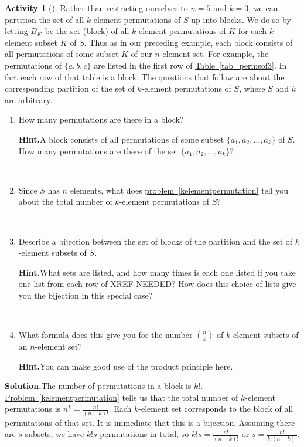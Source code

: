 \documentclass[10pt,]{book}
\theoremstyle{plain}
\theoremstyle{definition}
\newtheorem{activity}[project]{Activity}
\numberwithin{equation}{chapter}
\begin{document}
\begin{activity}[]\label{formulanchoosek}
Rather than restricting ourselves to \(n=5\) and \(k=3\), we can partition the set of all \(k\)-element permutations of \(S\) up into blocks. We do so by letting \(B_K\) be the set (block) of all \(k\)-element permutations of \(K\) for each \(k\)-element subset \(K\) of \(S\). Thus as in our preceding example, each block consists of all permutations of some subset \(K\) of our \(n\)-element set. For example, the permutations of \(\{a,b,c\}\) are listed in the first row of \hyperref[tab_permsof3]{Table~\ref{tab_permsof3}}. In fact each row of that table is a block. The questions that follow are about the corresponding partition of the set of \(k\)-element permutations of \(S\), where \(S\) and \(k\) are arbitrary.%
~\par
\begin{enumerate}[label=(\alph*)]
 \item How many permutations are there in a block?%
\par\medskip\noindent%
\textbf{Hint.}\quad A block consists of all permutations of some subset \(\{a_1 , a_2, \ldots, a_k \}\) of \(S\). How many permutations are there of the set \(\{a_1 , a_2, \ldots, a_k \}\)?%

~\par
\item Since \(S\) has \(n\) elements, what does \hyperref[kelementpermutation]{problem~\ref{kelementpermutation}} tell you about the total number of \(k\)-element permutations of \(S\)?%

~\par
\item Describe a bijection between the set of blocks of the partition and the set of \(k\)-element subsets of \(S\).%
\par\medskip\noindent%
\textbf{Hint.}\quad What sets are listed, and how many times is each one listed if you take one list from each row of XREF NEEDED? How does this choice of lists give you the bijection in this special case?%

~\par
\item What formula does this give you for the number \(\binom{n}{k}\) of \(k\)-element subsets of an \(n\)-element set?%
\par\medskip\noindent%
\textbf{Hint.}\quad You can make good use of the product principle here.%

\end{enumerate}
\par\medskip\noindent%
\textbf{Solution.}\quad The number of permutations in a block is \(k!\). \hyperref[kelementpermutation]{Problem~\ref{kelementpermutation}} tells us that the total number of \(k\)-element permutations is \(n^{\underline{k}}=\frac{n!}{(n-k)!}\). Each \(k\)-element set corresponds to the block of all permutations of that set. It is immediate that this is a bijection. Assuming there are \(s\) subsets, we have \(k!s\) permutations in total, so \(k!s=\frac{n!}{(n-k)!}\) or \(s= \frac{n!}{k!(n-k)!}\).%
\end{activity}
\end{document}
